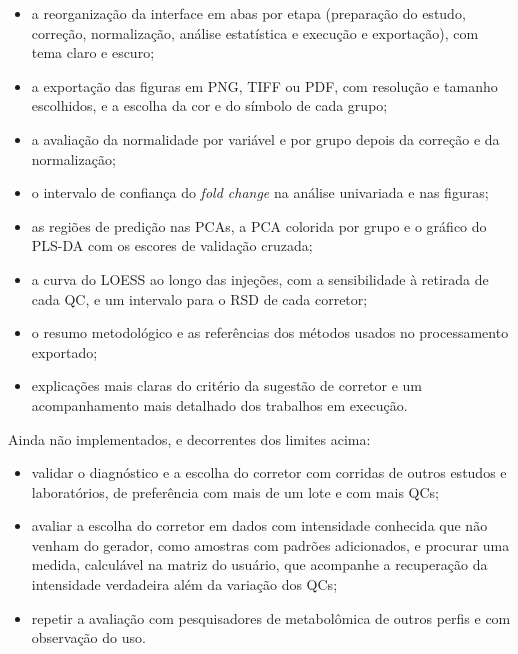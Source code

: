 \begin{itemize}
\item a reorganização da interface em abas por etapa (preparação do estudo, correção, normalização, análise estatística e execução e exportação), com tema claro e escuro;
\item a exportação das figuras em PNG, TIFF ou PDF, com resolução e tamanho escolhidos, e a escolha da cor e do símbolo de cada grupo;
\item a avaliação da normalidade por variável e por grupo depois da correção e da normalização;
\item o intervalo de confiança do \textit{fold change} na análise univariada e nas figuras;
\item as regiões de predição nas PCAs, a PCA colorida por grupo e o gráfico do PLS-DA com os escores de validação cruzada;
\item a curva do LOESS ao longo das injeções, com a sensibilidade à retirada de cada QC, e um intervalo para o RSD de cada corretor;
\item o resumo metodológico e as referências dos métodos usados no processamento exportado;
\item explicações mais claras do critério da sugestão de corretor e um acompanhamento mais detalhado dos trabalhos em execução.
\end{itemize}

Ainda não implementados, e decorrentes dos limites acima:

\begin{itemize}
\item validar o diagnóstico e a escolha do corretor com corridas de outros estudos e laboratórios, de preferência com mais de um lote e com mais QCs;
\item avaliar a escolha do corretor em dados com intensidade conhecida que não venham do gerador, como amostras com padrões adicionados, e procurar uma medida, calculável na matriz do usuário, que acompanhe a recuperação da intensidade verdadeira além da variação dos QCs;
\item repetir a avaliação com pesquisadores de metabolômica de outros perfis e com observação do uso.
\end{itemize}

